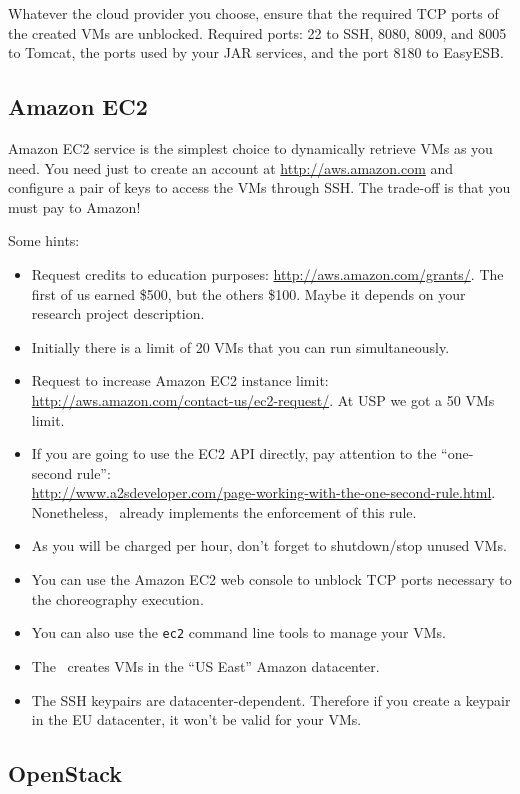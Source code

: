 Whatever the cloud provider you choose, ensure that the required TCP ports of the created VMs are unblocked. Required ports: 22 to SSH, 8080, 8009, and 8005 to Tomcat, the ports used by your JAR services, and the port 8180 to EasyESB.

\subsection{Amazon EC2}

Amazon EC2 service is the simplest choice to dynamically retrieve VMs as you need. You need just to create an account at \url{http://aws.amazon.com} and configure a pair of keys to access the VMs through SSH. The trade-off is that you must pay to Amazon! 

Some hints:

\begin{itemize}
\item Request credits to education purposes: \url{http://aws.amazon.com/grants/}. The first of us earned \$500, but the others \$100. Maybe it depends on your research project description.
\item Initially there is a limit of 20 VMs that you can run simultaneously.
\item Request to increase Amazon EC2 instance limit: \url{http://aws.amazon.com/contact-us/ec2-request/}. At USP we got a 50 VMs limit.
\item If you are going to use the EC2 API directly, pay attention to the ``one-second rule'': \\ \url{http://www.a2sdeveloper.com/page-working-with-the-one-second-rule.html}. Nonetheless, \ee\ already implements the enforcement of this rule.
\item As you will be charged per hour, don't forget to shutdown/stop unused VMs.
\item You can use the Amazon EC2 web console to unblock TCP ports necessary to the choreography execution.
\item You can also use the \texttt{ec2} command line tools to manage your VMs.
\item The \ee\ creates VMs in the ``US East'' Amazon datacenter.
\item The SSH keypairs are datacenter-dependent. Therefore if you create a keypair in the EU
datacenter, it won't be valid for your VMs.
\end{itemize}

\subsection{OpenStack}

